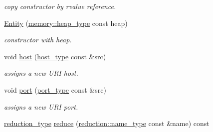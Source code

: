 \begin{DoxyCompactItemize}
\begin{DoxyCompactList}\small\item\em copy constructor by rvalue reference. \end{DoxyCompactList}\item 
\hypertarget{classhryky_1_1http_1_1header_1_1host_1_1_entity_a2639848797b5494f7954c32a9076071f}{\hyperlink{classhryky_1_1http_1_1header_1_1host_1_1_entity_a2639848797b5494f7954c32a9076071f}{Entity} (\hyperlink{classhryky_1_1memory_1_1heap_1_1_base}{memory\-::heap\-\_\-type} const heap)}\label{classhryky_1_1http_1_1header_1_1host_1_1_entity_a2639848797b5494f7954c32a9076071f}

\begin{DoxyCompactList}\small\item\em constructor with heap. \end{DoxyCompactList}\item 
\hypertarget{classhryky_1_1http_1_1header_1_1host_1_1_entity_a03ad1d4df17a5623d02d9366f3637f77}{void \hyperlink{classhryky_1_1http_1_1header_1_1host_1_1_entity_a03ad1d4df17a5623d02d9366f3637f77}{host} (\hyperlink{classhryky_1_1uri_1_1host_1_1_entity}{host\-\_\-type} const \&src)}\label{classhryky_1_1http_1_1header_1_1host_1_1_entity_a03ad1d4df17a5623d02d9366f3637f77}

\begin{DoxyCompactList}\small\item\em assigns a new U\-R\-I host. \end{DoxyCompactList}\item 
\hypertarget{classhryky_1_1http_1_1header_1_1host_1_1_entity_a91c79049a232a3e4bf5b609d6be5c20b}{void \hyperlink{classhryky_1_1http_1_1header_1_1host_1_1_entity_a91c79049a232a3e4bf5b609d6be5c20b}{port} (\hyperlink{classhryky_1_1uri_1_1port_1_1_entity}{port\-\_\-type} const \&src)}\label{classhryky_1_1http_1_1header_1_1host_1_1_entity_a91c79049a232a3e4bf5b609d6be5c20b}

\begin{DoxyCompactList}\small\item\em assigns a new U\-R\-I port. \end{DoxyCompactList}\item 
\hypertarget{classhryky_1_1http_1_1header_1_1host_1_1_entity_a99b2381af0eb9878ff63b04a394bc268}{\hyperlink{namespacehryky_a343a9a4c36a586be5c2693156200eadc}{reduction\-\_\-type} \hyperlink{classhryky_1_1http_1_1header_1_1host_1_1_entity_a99b2381af0eb9878ff63b04a394bc268}{reduce} (\hyperlink{namespacehryky_1_1reduction_ac686c30a4c8d196bbd0f05629a6b921f}{reduction\-::name\-\_\-type} const \&name) const }\label{classhryky_1_1http_1_1header_1_1host_1_1_entity_a99b2381af0eb9878ff63b04a394bc268}


\end{DoxyCompactItemize}

